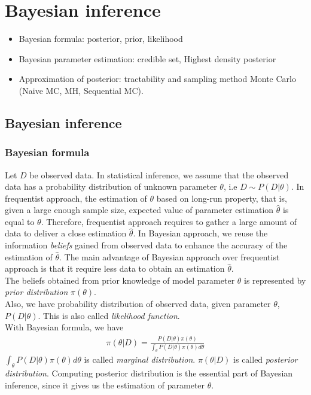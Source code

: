 \chapter{Bayesian inference}
 {\color{red}
  \begin{itemize}
      \item Bayesian formula: posterior, prior, likelihood
      \item Bayesian parameter estimation: credible set, Highest density posterior
      \item Approximation of posterior: tractability and sampling method Monte Carlo (Naive MC, MH, Sequential MC).
  \end{itemize}
 }

\section{Bayesian inference}
\subsection{Bayesian formula}
Let $D$ be observed data. In statistical inference, we assume that the observed
data has a probability distribution of unknown parameter $\theta$, i.e
$D \sim P(D|\theta)$. In frequentist approach, the estimation
of $\theta$ based on long-run property, that is, given a large enough sample
size, expected value of parameter estimation $\hat{\theta}$ is equal to
$\theta$. Therefore, frequentist approach requires to gather a large amount of
data to deliver a close estimation $\hat{\theta}$. In Bayesian approach, we
reuse the information \textit{beliefs} gained from observed data to enhance the
accuracy of the estimation of $\hat{\theta}$. The main advantage of Bayesian
approach over frequentist approach is that it require less data to obtain an
estimation $\hat{\theta}$.\\
The beliefs obtained from prior knowledge of model parameter $\theta$ is
represented by \textit{prior distribution} $\pi(\theta)$.\\
Also, we have probability distribution of observed data, given parameter
$\theta$, $P(D|\theta)$. This is also called \textit{likelihood function}.\\
With Bayesian formula, we have
\begin{align*}
    \pi(\theta | D) = \frac{P(D|\theta)\pi(\theta)}{\int_\theta P(D|\theta)\pi(\theta)d\theta}
\end{align*}
$\int_\theta P(D|\theta)\pi(\theta)d\theta$ is called \textit{marginal
    distribution}. $\pi(\theta | D)$ is called \textit{posterior distribution}.
Computing posterior distribution is the essential part of Bayesian inference,
since it gives us the estimation of parameter $\theta$.


